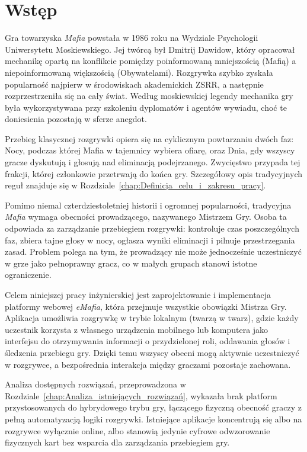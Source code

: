 ﻿\documentclass[a4paper,twoside,11pt]{mwrep}
\theoremstyle{plain} \newtheorem{thm}{Twierdzenie}
\theoremstyle{plain} \newtheorem{lem}{Lemat}
\theoremstyle{definition} \newtheorem{defn}{Definicja}
\theoremstyle{remark} \newtheorem*{rem}{Wniosek}
\begin{document}
\chapter*{Wstęp}
\setcounter{page}{1}

Gra towarzyska \textit{Mafia} powstała w 1986 roku na Wydziale Psychologii Uniwersytetu Moskiewskiego. Jej twórcą był Dmitrij Dawidow, który opracował mechanikę opartą na konflikcie pomiędzy poinformowaną mniejszością (Mafią) a niepoinformowaną większością (Obywatelami). Rozgrywka szybko zyskała popularność najpierw w środowiskach akademickich ZSRR, a następnie rozprzestrzeniła się na cały świat. Według moskiewskiej legendy mechanika gry była wykorzystywana przy szkoleniu dyplomatów i agentów wywiadu, choć te doniesienia pozostają w sferze anegdot.

Przebieg klasycznej rozgrywki opiera się na cyklicznym powtarzaniu dwóch faz: Nocy, podczas której Mafia w tajemnicy wybiera ofiarę, oraz Dnia, gdy wszyscy gracze dyskutują i głosują nad eliminacją podejrzanego. Zwycięstwo przypada tej frakcji, której członkowie przetrwają do końca gry. Szczegółowy opis tradycyjnych reguł znajduje się w Rozdziale~\ref{chap:Definicja_celu_i_zakresu_pracy}.

Pomimo niemal czterdziestoletniej historii i ogromnej popularności, tradycyjna \textit{Mafia} wymaga obecności prowadzącego, nazywanego Mistrzem Gry. Osoba ta odpowiada za zarządzanie przebiegiem rozgrywki: kontroluje czas poszczególnych faz, zbiera tajne głosy w nocy, ogłasza wyniki eliminacji i pilnuje przestrzegania zasad. Problem polega na tym, że prowadzący nie może jednocześnie uczestniczyć w grze jako pełnoprawny gracz, co w małych grupach stanowi istotne ograniczenie.

Celem niniejszej pracy inżynierskiej jest zaprojektowanie i implementacja platformy webowej \textit{eMafia}, która przejmuje wszystkie obowiązki Mistrza Gry. Aplikacja umożliwia rozgrywkę w trybie lokalnym (twarzą w twarz), gdzie każdy uczestnik korzysta z własnego urządzenia mobilnego lub komputera jako interfejsu do otrzymywania informacji o przydzielonej roli, oddawania głosów i śledzenia przebiegu gry. Dzięki temu wszyscy obecni mogą aktywnie uczestniczyć w rozgrywce, a bezpośrednia interakcja między graczami pozostaje zachowana.

Analiza dostępnych rozwiązań, przeprowadzona w Rozdziale~\ref{chap:Analiza_istniejących_rozwiązań}, wykazała brak platform przystosowanych do hybrydowego trybu gry, łączącego fizyczną obecność graczy z pełną automatyzacją logiki rozgrywki. Istniejące aplikacje koncentrują się albo na rozgrywce wyłącznie online, albo stanowią jedynie cyfrowe odwzorowanie fizycznych kart bez wsparcia dla zarządzania przebiegiem gry.
\end{document}
